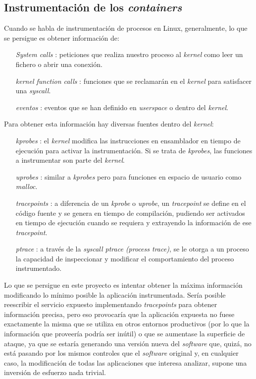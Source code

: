 \subsection{Instrumentación de los \emph{containers}}
\label{subsec:instrumentacion-containers}

Cuando se habla de instrumentación de procesos en Linux, generalmente, lo que se persigue es obtener información de:
\begin{enumerate}
    \item[\emph{System calls}]: peticiones que realiza nuestro proceso al \emph{kernel} como leer un fichero o abrir una conexión.
    \item[\emph{kernel function calls}]: funciones que se reclamarán en el \emph{kernel} para satisfacer una \emph{syscall}.
    \item[\emph{eventos}]: eventos que se han definido en \emph{userspace} o dentro del \emph{kernel}.
\end{enumerate}

Para obtener esta información hay diversas fuentes dentro del \emph{kernel}:

\begin{enumerate}
    \item[\emph{kprobes}]: el \emph{kernel} modifica las instrucciones en ensamblador en tiempo de ejecución para activar la instrumentación. Si se trata
    de \emph{kprobes}, las funciones a instrumentar son parte del \emph{kernel}. 
    \item[\emph{uprobes}]: similar a \emph{kprobes} pero para funciones en espacio de usuario como \emph{malloc}.
    \item[\emph{tracepoints}]: a diferencia de un \emph{kprobe} o \emph{uprobe}, un \emph{tracepoint} se define en el código fuente y se genera en tiempo de compilación, pudiendo ser activados en tiempo de ejecución cuando se requiera y extrayendo la información de ese \emph{tracepoint}.
    \item[\emph{ptrace}]: a través de la \emph{syscall ptrace (process trace)}, se le otorga a un proceso la capacidad de inspeccionar y modificar el comportamiento del proceso instrumentado. 
\end{enumerate}

Lo que se persigue en este proyecto es intentar obtener la máxima información modificando lo mínimo posible la aplicación instrumentada. Sería posible
reescribir el servicio expuesto implementando \emph{tracepoints} para obtener información precisa, pero eso provocaría que la aplicación expuesta no fuese exactamente la misma que se utiliza
en otros entornos productivos (por lo que la información que proveería podría ser inútil) o que se aumentase la superficie de ataque, ya que se estaría
generando una versión nueva del \emph{software} que, quizá, no está pasando por los mismos controles que el \emph{software} original y, en cualquier caso, la modificación de todas las aplicaciones
que interesa analizar, supone una inversión de esfuerzo nada trivial.

